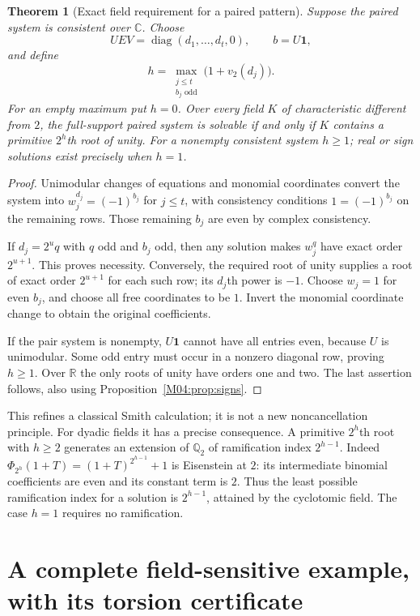 \documentclass[11pt,a4paper,oneside]{report}
\newtheorem{theorem}{Theorem}[section]
\theoremstyle{definition}
\theoremstyle{remark}
\newcommand{\C}{\mathbb C}
\newcommand{\Q}{\mathbb Q}
\newcommand{\R}{\mathbb R}
\newcommand{\one}{\mathbf 1}
\begin{document}
\begin{theorem}[Exact field requirement for a paired pattern]\label{M04:thm:field}
Suppose the paired system is consistent over $\C$. Choose
\[
UEV=\operatorname{diag}(d_1,\ldots,d_t,0),\qquad b=U\one,
\]
and define
\begin{equation}\label{M04:eq:h}
h=\max_{\substack{j\le t\\b_j\text{ odd}}}\bigl(1+v_2(d_j)\bigr).
\end{equation}
For an empty maximum put $h=0$. Over every field $K$ of characteristic
different from $2$, the full-support paired system is solvable if and
only if $K$ contains a primitive $2^h$th root of unity.
For a nonempty consistent system $h\ge1$; real or sign solutions
exist precisely when $h=1$.
\end{theorem}
\begin{proof}
Unimodular changes of equations and monomial coordinates convert the
system into $w_j^{d_j}=(-1)^{b_j}$ for $j\le t$, with consistency
conditions $1=(-1)^{b_j}$ on the remaining rows. Those remaining
$b_j$ are even by complex consistency.

If $d_j=2^u q$ with $q$ odd and $b_j$ odd, then any solution makes
$w_j^q$ have exact order $2^{u+1}$. This proves necessity. Conversely,
the required root of unity supplies a root of exact order $2^{u+1}$
for each such row; its $d_j$th power is $-1$. Choose $w_j=1$ for
even $b_j$, and choose all free coordinates to be $1$. Invert the
monomial coordinate change to obtain the original coefficients.

If the pair system is nonempty, $U\one$ cannot have all entries even,
because $U$ is unimodular. Some odd entry must occur in a nonzero
diagonal row, proving $h\ge1$. Over $\R$ the only roots of unity have
orders one and two. The last assertion follows, also using
Proposition~\ref{M04:prop:signs}.
\end{proof}

This refines a classical Smith calculation; it is not a new
noncancellation principle. For dyadic fields it has a precise
consequence. A primitive $2^h$th root with $h\ge2$ generates an
extension of $\Q_2$ of ramification index $2^{h-1}$. Indeed
$\Phi_{2^h}(1+T)=(1+T)^{2^{h-1}}+1$ is Eisenstein at $2$:
its intermediate binomial coefficients are even and its constant term
is $2$. Thus the least possible ramification index for a solution is
$2^{h-1}$, attained by the cyclotomic field. The case $h=1$ requires
no ramification.

\section{A complete field-sensitive example, with its torsion certificate}
\end{document}
